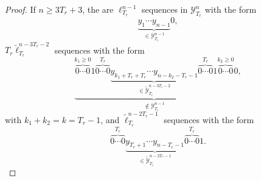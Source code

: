 \documentclass{article}
\begin{document}
\begin{proof}
        If $n \geq 3T_r + 3$, the are $\ell_{T_r}^{n-1}$ sequences in $\mathcal{Y}_{T_r}^{n}$ with the form 
        \begin{equation}
          \underbrace{y_{1} \cdots y_{n-1}}_{\in \mathcal{Y}_{T_r}^{n-1}} 0,
        \end{equation} 
        $T_r \tilde{\ell}_{T_r}^{n-3T_r-2}$ sequences with the form 
        \begin{equation}
          \underbrace{\overbrace{0 \cdots 0}^{k_1 \geq 0} 1 \overbrace{0 \cdots 0}^{T_r} 
          \underbrace{y_{k_1+T_r+T_r} \cdots y_{n-k_2-T_r-1}}_{\in \tilde{\mathcal{Y}}_{T_r}^{n-3T_r-2}}
          \overbrace{0 \cdots 0}^{T_r} 1 \overbrace{0 \cdots 0}^{k_2 \geq 0}}_{\not \in \mathcal{Y}_{T_r}^{n-1}} 0,
        \end{equation} 
        with $k_1 + k_2 = k = T_r-1$, and $\tilde{\ell}_{T_r}^{n-2T_r-1}$ sequences with the form 
        \begin{equation}
          \overbrace{0 \cdots 0}^{T_r} 
          \underbrace{y_{T_r+1} \cdots y_{n-T_r-1}}_{\in \tilde{\mathcal{Y}}_{T_r}^{n-2T_r-1}}
          \overbrace{0 \cdots 0}^{T_r} 1.
        \end{equation} 
      \end{proof}

\end{document}
